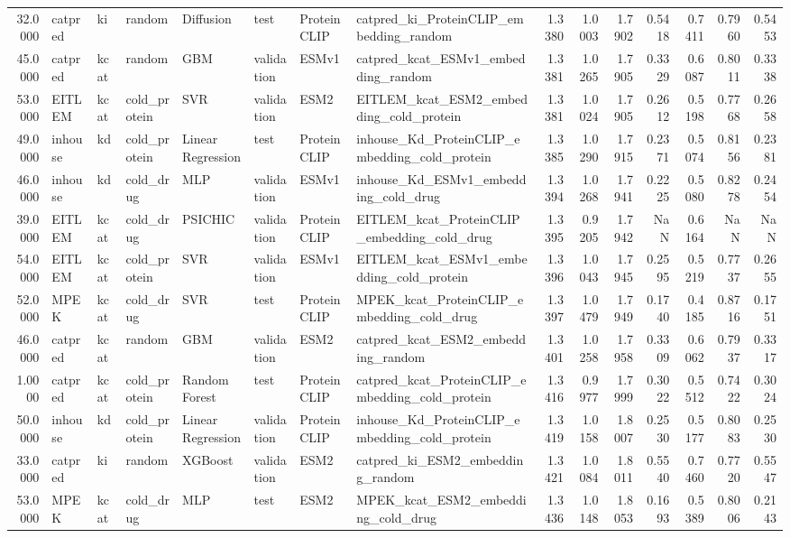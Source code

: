 \begin{tabular}{rlllllllrrrrrrr}
32.0000 & catpred & ki & random & Diffusion & test & ProteinCLIP & catpred_ki_ProteinCLIP_embedding_random & 1.3380 & 1.0003 & 1.7902 & 0.5418 & 0.7411 & 0.7960 & 0.5453 \\
45.0000 & catpred & kcat & random & GBM & validation & ESMv1 & catpred_kcat_ESMv1_embedding_random & 1.3381 & 1.0265 & 1.7905 & 0.3329 & 0.6087 & 0.8011 & 0.3338 \\
53.0000 & EITLEM & kcat & cold_protein & SVR & validation & ESM2 & EITLEM_kcat_ESM2_embedding_cold_protein & 1.3381 & 1.0024 & 1.7905 & 0.2612 & 0.5198 & 0.7768 & 0.2658 \\
49.0000 & inhouse & kd & cold_protein & Linear Regression & test & ProteinCLIP & inhouse_Kd_ProteinCLIP_embedding_cold_protein & 1.3385 & 1.0290 & 1.7915 & 0.2371 & 0.5074 & 0.8156 & 0.2381 \\
46.0000 & inhouse & kd & cold_drug & MLP & validation & ESMv1 & inhouse_Kd_ESMv1_embedding_cold_drug & 1.3394 & 1.0268 & 1.7941 & 0.2225 & 0.5080 & 0.8278 & 0.2454 \\
39.0000 & EITLEM & kcat & cold_drug & PSICHIC & validation & ProteinCLIP & EITLEM_kcat_ProteinCLIP_embedding_cold_drug & 1.3395 & 0.9205 & 1.7942 & NaN & 0.6164 & NaN & NaN \\
54.0000 & EITLEM & kcat & cold_protein & SVR & validation & ESMv1 & EITLEM_kcat_ESMv1_embedding_cold_protein & 1.3396 & 1.0043 & 1.7945 & 0.2595 & 0.5219 & 0.7737 & 0.2655 \\
52.0000 & MPEK & kcat & cold_drug & SVR & test & ProteinCLIP & MPEK_kcat_ProteinCLIP_embedding_cold_drug & 1.3397 & 1.0479 & 1.7949 & 0.1740 & 0.4185 & 0.8716 & 0.1751 \\
46.0000 & catpred & kcat & random & GBM & validation & ESM2 & catpred_kcat_ESM2_embedding_random & 1.3401 & 1.0258 & 1.7958 & 0.3309 & 0.6062 & 0.7937 & 0.3317 \\
1.0000 & catpred & kcat & cold_protein & Random Forest & test & ProteinCLIP & catpred_kcat_ProteinCLIP_embedding_cold_protein & 1.3416 & 0.9977 & 1.7999 & 0.3022 & 0.5512 & 0.7422 & 0.3024 \\
50.0000 & inhouse & kd & cold_protein & Linear Regression & validation & ProteinCLIP & inhouse_Kd_ProteinCLIP_embedding_cold_protein & 1.3419 & 1.0158 & 1.8007 & 0.2530 & 0.5177 & 0.8083 & 0.2530 \\
33.0000 & catpred & ki & random & XGBoost & validation & ESM2 & catpred_ki_ESM2_embedding_random & 1.3421 & 1.0084 & 1.8011 & 0.5540 & 0.7460 & 0.7720 & 0.5547 \\
53.0000 & MPEK & kcat & cold_drug & MLP & test & ESM2 & MPEK_kcat_ESM2_embedding_cold_drug & 1.3436 & 1.0148 & 1.8053 & 0.1693 & 0.5389 & 0.8006 & 0.2143 \\

\end{tabular}
